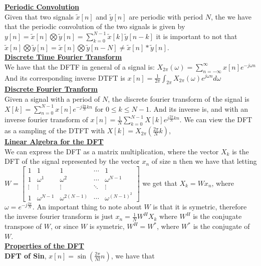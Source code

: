 \documentclass[9pt]{article}
\author{Lawrence Liu}
\begin{document}

\underline{\textbf{Periodic Convolution}}\\
Given that two signals $\tilde{x}[n]$ and $\tilde{y}[n]$
 are periodic with period $N$, the we have that the periodic
    convolution of the two signals is given by
    $\boxed{y[n]=\tilde{x}[n]\bigotimes\tilde{y}[n]
    =\sum_{k=0}^{N-1}\tilde{x}[k]\tilde{y}[n-k]}$ it is important 
    to not that 
    $\tilde{x}[n]\bigotimes\tilde{y}[n]=\tilde{x}[n]\bigotimes\tilde{y}[n-N]\neq
    \tilde{x}[n]*\tilde{y}[n]$.\\
\underline{\textbf{Discrete Time Fourier Transform}}\\
We have that the DFTF in general of a signal is: $X_{2\pi}(\omega) =\sum_{n=-\infty}^{\infty}x[n]e^{-j\omega n}$
And its corresponding inverse DTFT is $x[n] = \frac{1}{2\pi}\int_{2\pi}X_{2\pi}(\omega)e^{j\omega n}d\omega$\\
\underline{\textbf{Discrete Fourier Tranform}}\\
Given a signal with a period of $N$, the discrete fourier transform of the signal is 
$X[k]=\sum_{n=0}^{N-1}x[n]e^{-j\frac{2\pi}{N}kn}$ for $0\leq k\leq N-1$. And its inverse is, and with an inverse fourier transform of
$x[n]=\frac{1}{N}\sum_{k=0}^{N-1}X[k]e^{j\frac{2\pi}{N}kn}$. We can 
view the DFT as a sampling of the DTFT with $X[k]=X_{2\pi}(\frac{2\pi}{N}k)$,\\
\underline{\textbf{Linear Algebra for the DFT}}\\
We can express the DFT as a matrix multiplication, where
the vector $X_k$ is the DFT of the signal represented by the vector $x_n$
of size n then we have that letting $W=\begin{bmatrix}
    1 & 1 & 1 & \cdots & 1 \\
    1 & \omega^{1} & \omega^{2} & \cdots & \omega^{N-1} \\
    \vdots & \vdots & \vdots & \ddots & \vdots \\
    1 & \omega^{N-1} & \omega^{2(N-1)} & \cdots & \omega^{(N-1)^2}
\end{bmatrix}$ we get that
$\boxed{X_k=Wx_n}$, where $\omega=e^{-j\frac{2\pi}{N}}$. An important thing to note about $W$ is that it 
is symetric, therefore the inverse fourier transform is just 
$\boxed{x_n=\frac{1}{N}W^H X_k}$
where $W^H$ is the conjugate transpose of $W$, or since 
$W$ is symetric, $W^H=W^*$, where $W^*$ is the conjugate of $W$.\\
\underline{\textbf{Properties of the DFT}}\\
\textbf{DFT of Sin}, $x[n]=\sin(\frac{2\pi}{Nl}n)$, we have that
\end{document}
